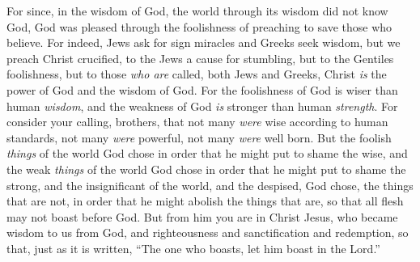 \begin{biblechapter}
\verse For since, in the wisdom of God, the world through its wisdom did not know God, God was pleased through the foolishness of preaching to save those who believe.
\verse For indeed, Jews ask for sign miracles and Greeks seek wisdom,
\verse but we preach Christ crucified, to the Jews a cause for stumbling, but to the Gentiles foolishness,
\verse but to those \textit{who are} called, both Jews and Greeks, Christ \textit{is} the power of God and the wisdom of God.
\verse For the foolishness of God is wiser than human \textit{wisdom}, and the weakness of God \textit{is} stronger than human \textit{strength}.
 For consider your calling, brothers, that not many \textit{were} wise according to human standards, not many \textit{were} powerful, not many \textit{were} well born.
\verse But the foolish \textit{things} of the world God chose in order that he might put to shame the wise, and the weak \textit{things} of the world God chose in order that he might put to shame the strong,
\verse and the insignificant of the world, and the despised, God chose, the things that are not, in order that he might abolish the things that are,
\verse so that all flesh may not boast before God.
\verse But from him you are in Christ Jesus, who became wisdom to us from God, and righteousness and sanctification and redemption,
\verse so that, just as it is written, “The one who boasts, let him boast in the Lord.”
\end{biblechapter}

